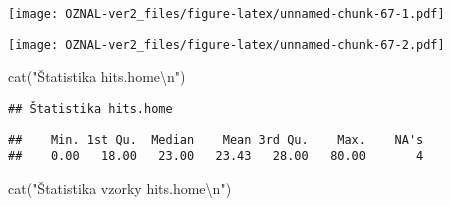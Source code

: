 \documentclass[
]{article}
\newenvironment{Shaded}{\begin{snugshade}}{\end{snugshade}}
\newcommand{\AttributeTok}[1]{\textcolor[rgb]{0.77,0.63,0.00}{#1}}
\newcommand{\DecValTok}[1]{\textcolor[rgb]{0.00,0.00,0.81}{#1}}
\newcommand{\FunctionTok}[1]{\textcolor[rgb]{0.00,0.00,0.00}{#1}}
\newcommand{\NormalTok}[1]{#1}
\newcommand{\OtherTok}[1]{\textcolor[rgb]{0.56,0.35,0.01}{#1}}
\newcommand{\SpecialCharTok}[1]{\textcolor[rgb]{0.00,0.00,0.00}{#1}}
\newcommand{\StringTok}[1]{\textcolor[rgb]{0.31,0.60,0.02}{#1}}
\begin{document}
\begin{Shaded}
\end{Shaded}

\texttt{[image: OZNAL-ver2\_files/figure-latex/unnamed-chunk-67-1.pdf]}

\begin{Shaded}
\end{Shaded}

\texttt{[image: OZNAL-ver2\_files/figure-latex/unnamed-chunk-67-2.pdf]}

\begin{Shaded}
\begin{Highlighting}[]
\FunctionTok{cat}\NormalTok{(}\StringTok{"Štatistika hits.home}\SpecialCharTok{\textbackslash{}n}\StringTok{"}\NormalTok{)}
\end{Highlighting}
\end{Shaded}

\begin{verbatim}
## Štatistika hits.home
\end{verbatim}

\begin{Shaded}
\end{Shaded}

\begin{verbatim}
##    Min. 1st Qu.  Median    Mean 3rd Qu.    Max.    NA's 
##    0.00   18.00   23.00   23.43   28.00   80.00       4
\end{verbatim}

\begin{Shaded}
\begin{Highlighting}[]
\FunctionTok{cat}\NormalTok{(}\StringTok{"Štatistika vzorky hits.home}\SpecialCharTok{\textbackslash{}n}\StringTok{"}\NormalTok{)}
\end{Highlighting}
\end{Shaded}
\end{document}
